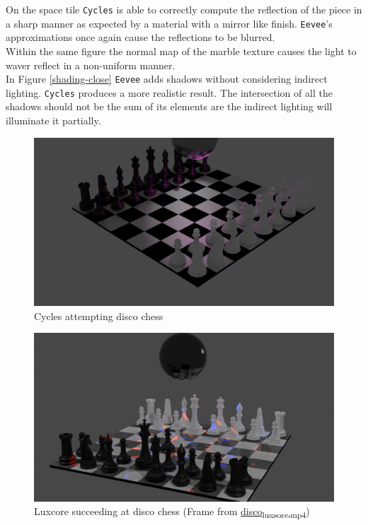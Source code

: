 \documentclass[11pt]{article}
\begin{document}
On the space tile \texttt{Cycles} is able to correctly compute the reflection of the
piece in a sharp manner as expected by a material with a mirror like finish.
\texttt{Eevee}'s approximations once again cause the reflections to be blurred.\\

Within the same figure the normal map of the marble texture causes the light to
waver reflect in a non-uniform manner.\\

In Figure \ref{shading-close} \texttt{Eevee} adds shadows without considering indirect
lighting. \texttt{Cycles} produces a more realistic result. The intersection of all the
shadows should not be the sum of its elements are the indirect lighting will
illuminate it partially.

\begin{figure}[htbp]
\centering
\includegraphics[width=\textwidth]{Images/Disco kinda working.png}
\caption{Cycles attempting disco chess}
\end{figure}

\begin{figure}[htbp]
\centering
\includegraphics[width=\textwidth]{Images/mpv-shot0001.jpg}
\caption{Luxcore succeeding at disco chess (Frame from \href{https://github.com/Jake-Moss/blender-chess/blob/master/Videos/disco\_luxcore.mp4}{disco\textsubscript{luxcore.mp4}})}
\end{figure}
\end{document}
